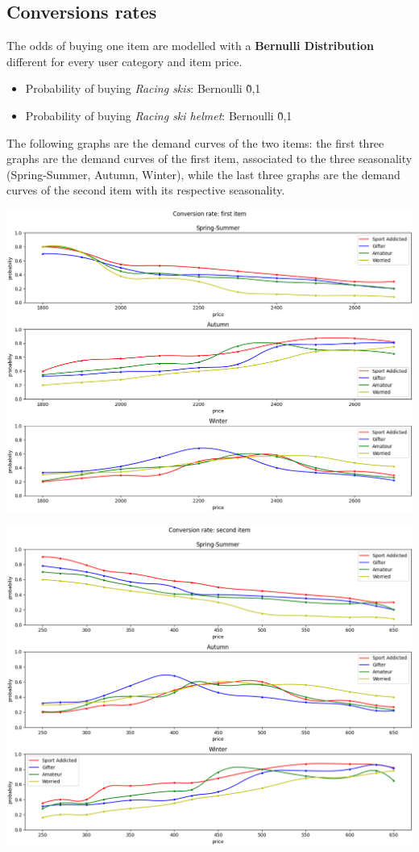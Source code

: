 \subsection*{Conversions rates}
The odds of buying one item are modelled with a \textbf{Bernulli Distribution} different for every user category and item price. 
\begin{itemize}
	\item Probability of buying \textit{Racing skis}: Bernoulli \~ 0,1
	\item Probability of buying \textit{Racing ski helmet}: Bernoulli \~ 0,1
\end{itemize}
The following graphs are the demand curves of the two items: the first three graphs are the demand curves of the first item, associated to the three seasonality (Spring-Summer, Autumn, Winter), while the last three graphs are the demand curves of the second item with its respective seasonality.
\begin{center}
	\includegraphics[scale=0.5]{Images/CR_fstItem}
\end{center}

\begin{center}
	\includegraphics[scale=0.5]{Images/CR_scndItem}
\end{center}

